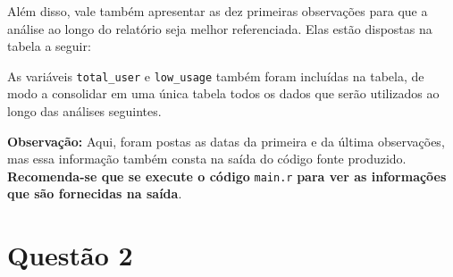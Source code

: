 \documentclass[10pt, a4paper]{article}
\begin{document}
Além disso, vale também apresentar as dez primeiras observações para que a análise ao longo do relatório seja melhor referenciada. Elas estão
dispostas na tabela a seguir:

\begin{table}[h]
\centering
\caption{Primeiras dez observações do conjunto \texttt{data\_group}}
\label{tab:first-ten}
\end{table}

As variáveis \texttt{total\_user} e \texttt{low\_usage} também foram incluídas na tabela, 
de modo a consolidar em uma única tabela todos os dados que serão utilizados ao longo das análises seguintes.

\textbf{Observação:} Aqui, foram postas as datas da primeira e da última observações, mas essa informação
também consta na saída do código fonte produzido. \textbf{Recomenda-se que se execute o código} \texttt{main.r} \textbf{para ver as informações
que são fornecidas na saída}.
\pagebreak

\section{Questão 2}
\end{document}
